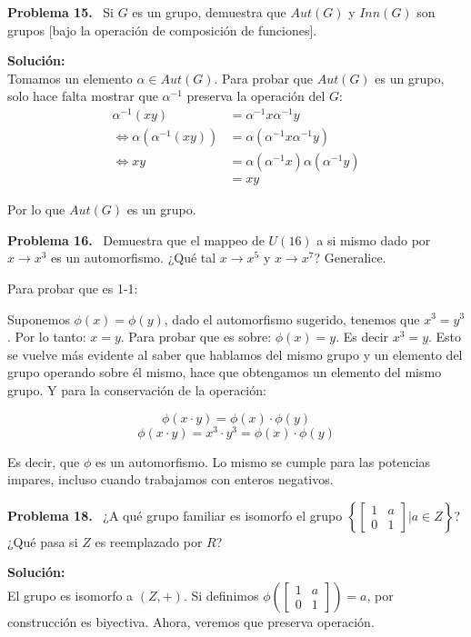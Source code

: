 \documentclass{article}
\newcounter{problem}
\newcounter{solution}
\newcommand\Problem[1]{%
  \stepcounter{problem}%
  \textbf{Problema #1.}~%
  \setcounter{solution}{0}%
}
\newcommand\TheSolution{%
  \textbf{Solución:}\\%
}
\begin{document}
\Problem{15} Si $G$ es un grupo, demuestra que $Aut(G)$ y $Inn(G)$ son grupos
[bajo la operación de composición de funciones].

\TheSolution{} Tomamos un elemento $\alpha \in Aut(G)$. Para probar que
$Aut(G)$ es un grupo, solo hace falta mostrar que $\alpha^{-1}$ preserva la
operación del $G$:
\[
\begin{split}
  \alpha^{-1}(xy)              &= \alpha^{-1}x\alpha^{-1}y \\
  \iff \alpha(\alpha^{-1}(xy)) &= \alpha(\alpha^{-1}x\alpha^{-1}y) \\
  \iff xy                      &= \alpha(\alpha^{-1}x)\alpha(\alpha^{-1}y) \\
                               &= xy
  \end{split}
\]

Por lo que $Aut(G)$ es un grupo.

\Problem{16} Demuestra que el mappeo de $U(16)$ a si mismo dado por $x
\rightarrow x^3$ es un automorfismo. ¿Qué tal $x \rightarrow x^5$ y $x
\rightarrow x^{7}$? Generalice.

Para probar que es 1-1:

Suponemos $\phi (x) = \phi (y)$, dado el automorfismo sugerido, tenemos que
$x^{3}=y^{3}$. Por lo tanto: $x=y$. Para probar que es sobre: $\phi (x) = y$.
Es decir $x^{3}=y$. Esto se vuelve más evidente al saber que hablamos del mismo
grupo y un elemento del grupo operando sobre él mismo, hace que obtengamos un
elemento del mismo grupo. Y para la conservación de la operación:

$$\phi (x\cdot y) = \phi (x)\cdot \phi (y)$$
$$\phi (x\cdot y) = x^{3}\cdot y^{3} = \phi (x)\cdot \phi (y)$$

Es decir, que $\phi$ es un automorfismo. Lo mismo se cumple para las potencias
impares, incluso cuando trabajamos con enteros negativos.

\Problem{18} ¿A qué grupo familiar es isomorfo el grupo $\left \{
\begin{bmatrix}
1 & a \\
0 & 1
\end{bmatrix} | a \in Z \right \}$? ¿Qué pasa si $Z$ es reemplazado por $R$?

\TheSolution{}
El grupo es isomorfo a $(Z, +)$. Si definimos $\phi\left(\begin{bmatrix}
1 & a \\
0 & 1
\end{bmatrix}\right) = a$, por construcción es biyectiva. Ahora, veremos que preserva operación.
\end{document}
